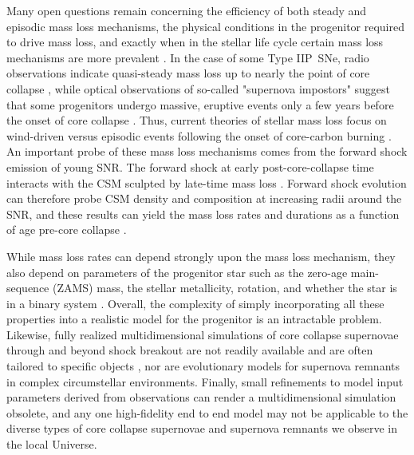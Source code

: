 \documentclass[twocolumn]{aastex631}
\begin{document}
Many open questions remain concerning the efficiency of both steady and episodic mass loss mechanisms, the physical conditions in the progenitor required to drive mass loss, and exactly when in the stellar life cycle certain mass loss mechanisms are more prevalent \citep[e.g.,][]{QSwave, smith14, fuller17}. In the case of some Type IIP~SNe, radio observations indicate quasi-steady mass loss up to nearly the point of core collapse \citep[e.g., SN~2011ja;][]{chakraborti16}, while optical observations of so-called "supernova impostors" suggest that some progenitors undergo massive, eruptive events only a few years before the onset of core collapse \citep[e.g., SN~2009fk; SN~2009ip;][]{moriya11,margutti14}. Thus, current theories of stellar mass loss focus on wind-driven versus episodic events following the onset of core-carbon burning \citep{pat17}. An important probe of these mass loss mechanisms comes from the forward shock emission of young SNR. The forward shock at early post-core-collapse time interacts with the CSM sculpted by late-time mass loss \citep{Ch82csm}. Forward shock evolution can therefore probe CSM density and composition at increasing radii around the SNR, and these results can yield the mass loss rates and durations as a function of age pre-core collapse \citep{Ch82mdot, CF94csm}.

While mass loss rates can depend strongly upon the mass loss mechanism, they also depend on parameters of the progenitor star such as the zero-age main-sequence (ZAMS) mass,
the stellar metallicity, rotation, and whether the star is in a binary system \citep[e.g.][]{maeda15,ouchi17}. Overall, the complexity of simply incorporating all these properties into a realistic model for the progenitor is an intractable problem. Likewise, fully realized multidimensional simulations of core collapse supernovae through and beyond shock breakout are not readily available and are often tailored to specific objects \citep[e.g.,][]{orlando20,orlando21}, nor are evolutionary models for supernova remnants in complex circumstellar environments. Finally, small refinements to model input parameters derived from observations can render a multidimensional simulation obsolete, and any one high-fidelity end to end model may not be applicable to the diverse types of core collapse supernovae and supernova remnants we observe in the local Universe. 
\end{document}
